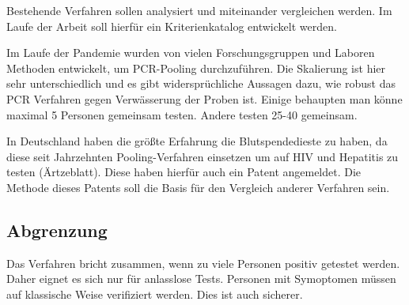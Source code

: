 Bestehende Verfahren sollen analysiert und miteinander vergleichen werden.
Im Laufe der Arbeit soll hierfür ein Kriterienkatalog entwickelt werden.

Im Laufe der Pandemie wurden von vielen Forschungsgruppen und Laboren Methoden entwickelt, um PCR-Pooling durchzuführen. Die Skalierung ist hier sehr unterschiedlich und es gibt widersprüchliche Aussagen dazu, wie robust das PCR Verfahren gegen Verwässerung der Proben ist. Einige behaupten man könne maximal 5 Personen gemeinsam testen. Andere testen 25-40 gemeinsam.

In Deutschland haben die größte Erfahrung die Blutspendedieste zu haben, da diese seit Jahrzehnten Pooling-Verfahren einsetzen um auf HIV und Hepatitis zu testen (Ärtzeblatt). Diese haben hierfür auch ein Patent angemeldet. Die Methode dieses Patents soll die Basis für den Vergleich anderer Verfahren sein.

\subsection{Abgrenzung}
Das Verfahren bricht zusammen, wenn zu viele Personen positiv getestet werden.
Daher eignet es sich nur für anlasslose Tests.
Personen mit Symoptomen müssen auf klassische Weise verifiziert werden. Dies ist auch sicherer.
\fi